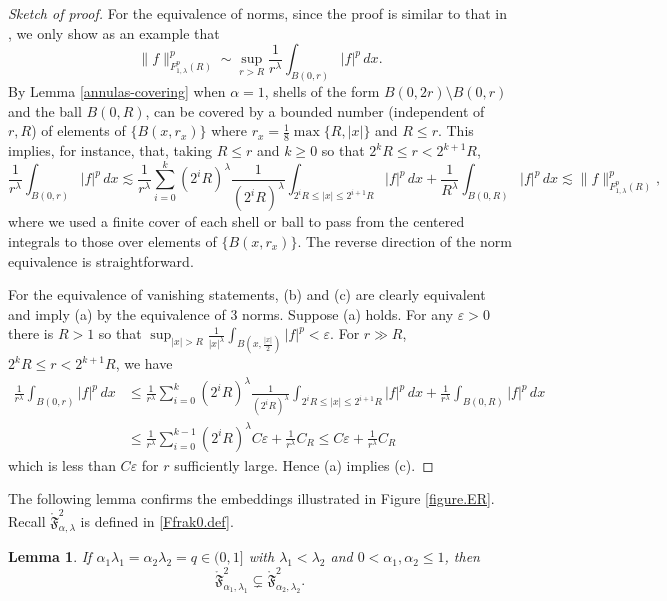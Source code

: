 \documentclass[11pt]{article}
\numberwithin{equation}{section}
\newtheorem{lem}[thm]{Lemma}
\theoremstyle{remark}
\theoremstyle{definition}
\newcommand\al{\alpha}
\newcommand\e {\varepsilon}  %
\newcommand\la{\lambda}
\newcommand{\EQN}[1]{\begin{equation*}\begin{split} #1 \end{split}\end{equation*}}
\begin{document}
\begin{proof} [Sketch of proof]  {For the equivalence of norms, since the proof is similar to that in  \cite[Lemma 2.1]{BKT}, we only show as an example that}
\[
\| f\|_{{ F}^{p}_{1,\lambda}(R)}^p\sim  \sup_{r>R} \frac 1 {r^\lambda}\int_{B(0,r)}|f|^p\,dx.
\]
By Lemma \ref{annulas-covering} when $\al=1$, shells of the form $B(0,2r)\setminus B(0,r)$ and  the ball $B(0,R)$, can be covered by a  bounded number {(independent of $r,R$)} of elements of $\{ B(x,r_x)\}$ where $r_x = \frac 1 8 \max\{R,|x| \}$ and $R \le r$. 
This implies, for instance, that, taking $R\leq r $ and  {$k\ge0$ so that $2^kR\leq r <2^{k+1}R$,}
\[
\frac 1 {r^\lambda} \int_{B(0,r)} |f|^p \,dx\lesssim  \frac 1 {r^\lambda} \sum_{i=0}^{k} (2^{i}R)^\lambda \frac {1}  {(2^{i}R)^\lambda}\! \int_{2^i R \leq |x|\leq 2^{i+1}R}|f|^p\,dx				+  \frac 1 {R^\lambda}\!\int_{B(0,R)} |f|^p\,dx\lesssim \| f\|_{{ F}^{p}_{1,\lambda}(R)}^p,
\]
where we used a finite cover of each shell or ball to pass from the centered integrals to those over elements of $\{ B(x,r_x)\}$. The reverse direction of the norm equivalence is straightforward.

For the equivalence of vanishing statements, (b) and (c) are clearly equivalent and imply (a) by the equivalence of 3 norms. Suppose (a) holds. For any $\e>0$ there is $R>1$ so that  $\sup_{|x|>R}  \frac1{|x|^\la}\!\int_{B(x,  \frac{|x|}2)}|f|^p< \e$. For $r\gg R$, $2^kR\leq r <2^{k+1}R$, we have
\EQN{
\frac 1 {r^\lambda} \int_{B(0,r)} |f|^p \,dx &\le  \frac 1 {r^\lambda} \sum_{i=0}^{k} (2^{i}R)^\lambda \frac {1}  {(2^{i}R)^\lambda}\! \int_{2^i R \leq |x|\leq 2^{i+1}R}|f|^p\,dx				+  \frac 1 {r^\lambda}\!\int_{B(0,R)} |f|^p\,dx
\\
&\le \frac 1 {r^\lambda} \sum_{i=0}^{k-1} (2^{i}R)^\lambda C\e
+  \frac 1 {r^\lambda}C_R
\le C\e +  \frac 1 {r^\lambda}C_R
}
which is less than $C\e$ for $r$ sufficiently large. Hence (a) implies (c).
\end{proof}




%
The following lemma confirms the embeddings illustrated in Figure \ref{figure.ER}.
{Recall $\mathring {\mathfrak F}^{2}_{\al,\la}$ is defined in \eqref{Ffrak0.def}.}
\begin{lem}\label{Remark.ER}
If $\al_1\la_1=\al_2\la_2=q\in (0,1]$ with $\la_1 < \la_2$ and $0<\al_1,\al_2\leq 1$,
then
\[
\mathring {\mathfrak F}^{2}_{\al_1,\la_1}\subsetneq \mathring {\mathfrak F}^{2}_{\al_2,\la_2}.
\]
%
%
%
%
\end{lem}
\end{document}
